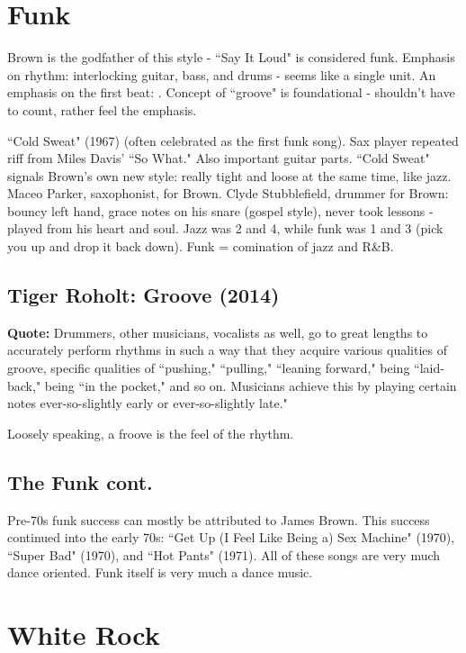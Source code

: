\documentclass[12pt, a4paper, twoside, openright, titlepage]{book}
\begin{document}
\section{Funk}

Brown is the godfather of this style - ``Say It Loud" is considered funk. Emphasis on rhythm: interlocking guitar, bass, and drums - seems like a single unit. An emphasis on the first beat: . Concept of ``groove" is foundational - shouldn't have to count, rather feel the emphasis.

\begin{eg}{}{}
    ``Cold Sweat" (1967) (often celebrated as the first funk song). Sax player repeated riff from Miles Davis' ``So What." Also important guitar parts. ``Cold Sweat" signals Brown's own new style: really tight and loose at the same time, like jazz. Maceo Parker, saxophonist, for Brown. Clyde Stubblefield, drummer for Brown: bouncy left hand, grace notes on his snare (gospel style), never took lessons - played from his heart and soul. Jazz was 2 and 4, while funk was 1 and 3 (pick you up and drop it back down). Funk = comination of jazz and R\&B.
\end{eg}


\subsection{Tiger Roholt: Groove (2014)}

\textbf{Quote:} Drummers, other musicians, vocalists as well, go to great lengths to accurately perform rhythms in such a way that they acquire various qualities of groove, specific qualities of ``pushing," ``pulling," ``leaning forward," being ``laid-back," being ``in the pocket," and so on. Musicians achieve this by playing certain notes ever-so-slightly early or ever-so-slightly late."

Loosely speaking, a froove is the feel of the rhythm.


\subsection{The Funk cont.}

Pre-70s funk success can mostly be attributed to James Brown. This success continued into the early 70s: ``Get Up (I Feel Like Being a) Sex Machine" (1970), ``Super Bad" (1970), and ``Hot Pants" (1971). All of these songs are very much dance oriented. Funk itself is very much a dance music.


\section{White Rock}
\end{document}
